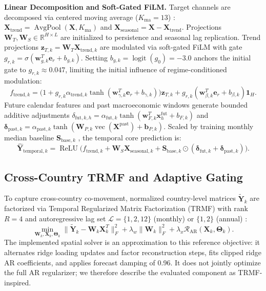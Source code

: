 \documentclass[sigconf]{acmart}
\begin{document}
\textbf{Linear Decomposition and Soft-Gated FiLM.} Target channels are decomposed via centered moving average ($K_{\text{ma}}=13$) \cite{zeng2023dlinear}: $\mathbf{X}_{\text{trend}} = \operatorname{AvgPool}(\mathbf{X}, K_{\text{ma}})$ and $\mathbf{X}_{\text{seasonal}} = \mathbf{X} - \mathbf{X}_{\text{trend}}$. Projections $\mathbf{W}_T, \mathbf{W}_S \in \mathbb{R}^{H\times L}$ are initialized to persistence and seasonal lag replication. Trend projections $\mathbf{z}_{T,k}=\mathbf{W}_T\mathbf{X}_{\text{trend},k}$ are modulated via soft-gated FiLM \cite{perez2018film} with gate $g_{r,k}=\sigma(\mathbf{w}_{g,k}^T\mathbf{e}_r+b_{g,k})$. Setting $b_{g,k} = \operatorname{logit}(g_0) = -3.0$ anchors the initial gate to $g_{r,k} \approx 0.047$, limiting the initial influence of regime-conditioned modulation:
\begin{equation}
f_{\text{trend}, k} = \big(1 + g_{r,k} \alpha_{\text{trend}, k} \tanh(\mathbf{w}_{\gamma, k}^T \mathbf{e}_r + b_{\gamma, k})\big) \mathbf{z}_{T,k} + g_{r,k} (\mathbf{w}_{\beta, k}^T \mathbf{e}_r + b_{\beta, k})\mathbf{1}_H.
\label{eq:film_trend}
\end{equation}
Future calendar features and past macroeconomic windows generate bounded additive adjustments $\delta_{\text{fut}, k, h} = \alpha_{\text{fut}, k} \tanh(\mathbf{w}_{F, k}^T \mathbf{x}^{\text{fut}}_h + b_{F, k})$ and $\boldsymbol{\delta}_{\text{past}, k} = \alpha_{\text{past}, k} \tanh(\mathbf{W}_{P, k} \operatorname{vec}(\mathbf{X}^{\text{past}}) + \mathbf{b}_{P, k})$. Scaled by training monthly median baseline $\mathbf{S}_{\text{base}, k}$ \cite{hastie1990gam}, the temporal core prediction is:
\begin{equation}
\hat{\mathbf{Y}}_{\text{temporal}, k} = \operatorname{ReLU}\Big(f_{\text{trend}, k} + \mathbf{W}_S \mathbf{X}_{\text{seasonal}, k} + \mathbf{S}_{\text{base}, k} \odot (\boldsymbol{\delta}_{\text{fut}, k} + \boldsymbol{\delta}_{\text{past}, k})\Big).
\label{eq:temporal_forecast}
\end{equation}

\subsection{Cross-Country TRMF and Adaptive Gating}
\label{sec:trmf}
To capture cross-country co-movement, normalized country-level matrices $\widetilde{\mathbf{Y}}_k$ are factorized via Temporal Regularized Matrix Factorization (TRMF) with rank $R=4$ and autoregressive lag set $\mathcal{L}=\{1,2,12\}$ (monthly) or $\{1,2\}$ (annual) \cite{yu2016trmf}:
\begin{equation}
\min_{\mathbf{W}_k, \mathbf{X}_k, \boldsymbol{\Theta}_k} \|\widetilde{\mathbf{Y}}_k - \mathbf{W}_k \mathbf{X}_k^T\|_F^2 + \lambda_w \|\mathbf{W}_k\|_F^2 + \lambda_x \mathcal{R}_{\text{AR}}(\mathbf{X}_k, \boldsymbol{\Theta}_k).
\label{eq:trmf_objective}
\end{equation}
The implemented spatial solver is an approximation to this reference objective: it alternates ridge loading updates and factor reconstruction steps, fits clipped ridge AR coefficients, and applies forecast damping of 0.96. It does not jointly optimize the full AR regularizer; we therefore describe the evaluated component as TRMF-inspired.
\end{document}
